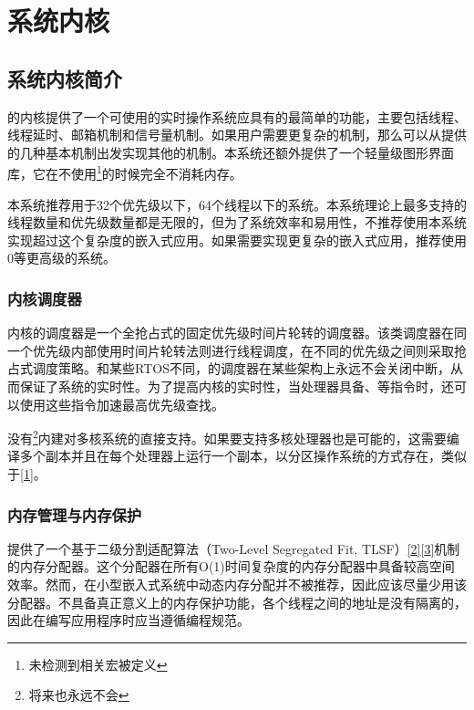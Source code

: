 \chapter{系统内核}\label{ch:system-kernel}

\section{系统内核简介}\label{sec:kernel-introduction}

的内核提供了一个可使用的实时操作系统应具有的最简单的功能，主要包括线程、线程延时、邮箱机制和信号量机制。如果用户需要更复杂的机制，那么可以从提供的几种基本机制出发实现其他的机制。本系统还额外提供了一个轻量级图形界面库，它在不使用\footnote{未检测到相关宏被定义}的时候完全不消耗内存。

本系统推荐用于32个优先级以下，64个线程以下的系统。本系统理论上最多支持的线程数量和优先级数量都是无限的，但为了系统效率和易用性，不推荐使用本系统实现超过这个复杂度的嵌入式应用。如果需要实现更复杂的嵌入式应用，推荐使用0等更高级的系统。

\subsection{内核调度器}\label{subsec:kernel-scheduler}

内核的调度器是一个全抢占式的固定优先级时间片轮转的调度器。该类调度器在同一个优先级内部使用时间片轮转法则进行线程调度，在不同的优先级之间则采取抢占式调度策略。和某些RTOS不同，的调度器在某些架构上永远不会关闭中断，从而保证了系统的实时性。为了提高内核的实时性，当处理器具备、等指令时，还可以使用这些指令加速最高优先级查找。

没有\footnote{将来也永远不会}内建对多核系统的直接支持。如果要支持多核处理器也是可能的，这需要编译多个副本并且在每个处理器上运行一个副本，以分区操作系统的方式存在，类似于\hyperref[sec:chapter-bibliography-4]{{[}1{]}}。

\subsection{内存管理与内存保护}\label{subsec:memory-management-and-memory-protection}

提供了一个基于二级分割适配算法（Two-Level Segregated Fit,
TLSF）\hyperref[sec:chapter-bibliography-4]{{[}2{]}{[}3{]}}机制的内存分配器。这个分配器在所有O(1)时间复杂度的内存分配器中具备较高空间效率。然而，在小型嵌入式系统中动态内存分配并不被推荐，因此应该尽量少用该分配器。不具备真正意义上的内存保护功能，各个线程之间的地址是没有隔离的，因此在编写应用程序时应当遵循编程规范。

